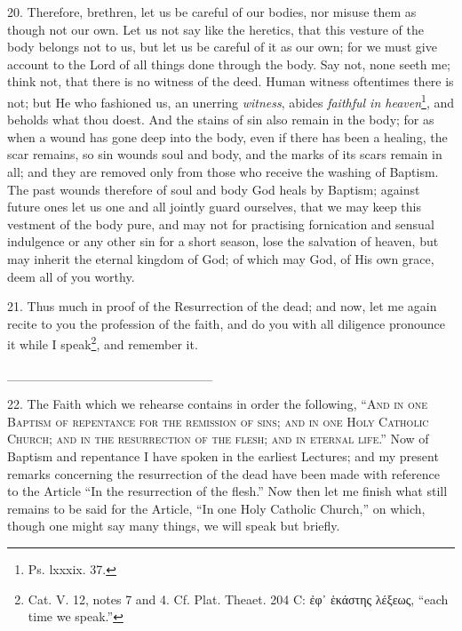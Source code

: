 20. Therefore, brethren, let us be careful of our bodies, nor misuse them as though not our own. Let us not say like the heretics, that this vesture of the body belongs not to us, but let us be careful of it as our own; for we must give account to the Lord of all things done through the body. Say not, none seeth me; think not, that there is no witness of the deed. Human witness oftentimes there is not; but He who fashioned us, an unerring \emph{witness}, abides \emph{faithful in heaven}\footnote{Ps. lxxxix. 37.}, and beholds what thou doest. And the stains of sin also remain in the body; for as when a wound has gone deep into the body, even if there has been a healing, the scar remains, so sin wounds soul and body, and the marks of its scars remain in all; and they are removed only from those who receive the washing of Baptism. The past wounds therefore of soul and body God heals by Baptism; against future ones let us one and all jointly guard ourselves, that we may keep this vestment of the body pure, and may not for practising fornication and sensual indulgence or any other sin for a short season, lose the salvation of heaven, but may inherit the eternal kingdom of God; of which may God, of His own grace, deem all of you worthy.

21. Thus much in proof of the Resurrection of the dead; and now, let me again recite to you the profession of the faith, and do you with all diligence pronounce it while I speak\footnote{Cat. V. 12, notes 7 and 4. Cf. Plat. Theaet. 204 C: \textgreek{ἐφ᾽ ἑκάστης λέξεως}, “each time we speak.”}, and remember it.

\_\_\_\_\_\_\_\_\_\_\_\_\_\_\_\_\_\_\_\_\_\_

22. The Faith which we rehearse contains in order the following, “\textsc{And in one Baptism of repentance for the remission of sins; and in one Holy Catholic Church; and in the resurrection of the flesh; and in eternal life}.” Now of Baptism and repentance I have spoken in the earliest Lectures; and my present remarks concerning the resurrection of the dead have been made with reference to the Article “In the resurrection of the flesh.” Now then let me finish what still remains to be said for the Article, “In one Holy Catholic Church,” on which, though one might say many things, we will speak but briefly.

